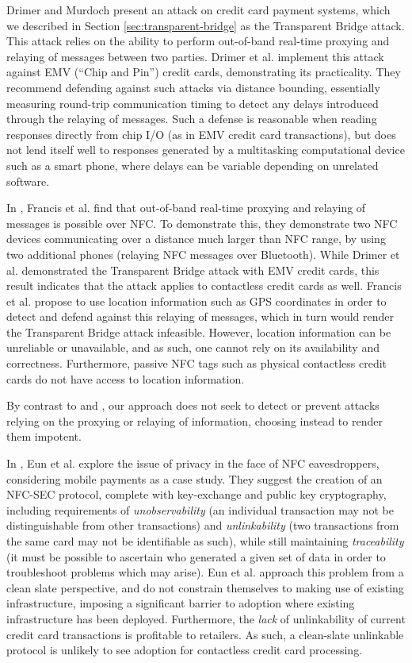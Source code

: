 Drimer and Murdoch \cite{Drimer:2007:KYE:1362903.1362910} present an attack on credit card payment systems,
    which we described in Section \ref{sec:transparent-bridge} as the Transparent Bridge attack.
This attack relies on the ability to perform out-of-band real-time proxying and relaying of messages between two parties.
Drimer et al. implement this attack against EMV (``Chip and Pin'') credit cards, demonstrating its practicality.
They recommend defending against such attacks via distance bounding,
    essentially measuring round-trip communication timing to detect any delays introduced through the relaying of messages.
Such a defense is reasonable when reading responses directly from chip I/O (as in EMV credit card transactions),
    but does not lend itself well to responses generated by a multitasking computational device such as a smart phone,
    where delays can be variable depending on unrelated software.

In \cite{francis2010practical}, Francis et al. find that out-of-band real-time proxying and relaying of messages is possible over NFC.
To demonstrate this, they demonstrate two NFC devices communicating over a distance much larger than NFC range,
    by using two additional phones (relaying NFC messages over Bluetooth).
While Drimer et al. demonstrated the Transparent Bridge attack with EMV credit cards,
    this result indicates that the attack applies to contactless credit cards as well.
Francis et al. propose to use location information such as GPS coordinates in order to detect and defend against this relaying of messages,
    which in turn would render the Transparent Bridge attack infeasible.
However, location information can be unreliable or unavailable, and as such, one cannot rely on its availability and correctness.
Furthermore, passive NFC tags such as physical contactless credit cards do not have access to location information.

By contrast to \cite{francis2010practical} and \cite{Drimer:2007:KYE:1362903.1362910},
    our approach does not seek to detect or prevent attacks relying on the proxying or relaying of information, choosing instead to render them impotent.

In \cite{eun2013conditional}, Eun et al. explore the issue of privacy in the face of NFC eavesdroppers, considering mobile payments as a case study.
They suggest the creation of an NFC-SEC protocol, complete with key-exchange and public key cryptography, including requirements of
    \emph{unobservability} (an individual transaction may not be distinguishable from other transactions) and
    \emph{unlinkability} (two transactions from the same card may not be identifiable as such), while still maintaining
    \emph{traceability} (it must be possible to ascertain who generated a given set of data in order to troubleshoot problems which may arise).
Eun et al. approach this problem from a clean slate perspective, and do not constrain themselves to making use of existing infrastructure,
    imposing a significant barrier to adoption where existing infrastructure has been deployed.
Furthermore, the \emph{lack} of unlinkability of current credit card transactions is profitable to retailers.
As such, a clean-slate unlinkable protocol is unlikely to see adoption for contactless credit card processing.